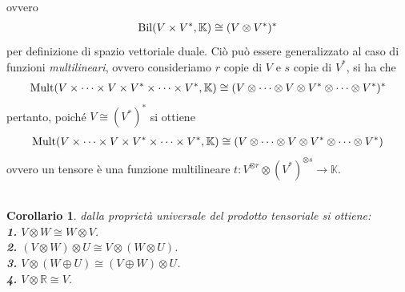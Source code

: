 \documentclass[oneside, 11pt]{amsbook}
\newcommand{\0}{{(0)}}
\newcommand{\3}{{(3)}}
\theoremstyle{colonplain}
\newtheorem{cor}[thm]{Corollario}
\theoremstyle{colondefinition}
\theoremstyle{colonremark}
\numberwithin{equation}{chapter}
\begin{document}
ovvero
\begin{align}
    \mathrm{Bil}(V \times V^*, \mathbb{K}) \cong (V \otimes V^*)^* \notag
\end{align}
per definizione di spazio vettoriale duale. Ciò può essere generalizzato al caso di funzioni \textit{multilineari}, ovvero consideriamo $r$ copie di $V$ e $s$ copie di $V^*$, si ha che
\begin{align}
    \mathrm{Mult}(V \times \dots \times V \times V^* \times \dots \times V^*, \mathbb{K}) \cong (V \otimes \dots \otimes V \otimes V^* \otimes \dots \otimes V^*)^* \notag
\end{align}
pertanto, poiché $V \cong (V^*)^*$ si ottiene
\begin{align}
    \mathrm{Mult}(V \times \dots \times V \times V^* \times \dots \times V^*, \mathbb{K}) \cong (V \otimes \dots \otimes V \otimes V^* \otimes \dots \otimes V^*) \notag
\end{align}
ovvero un tensore è una funzione multilineare $t : V^{\otimes r} \otimes (V^*)^{\otimes s} \longrightarrow \mathbb{K}$. \\ \\
\begin{cor}\label{TensorIso} dalla \textit{proprietà universale del prodotto tensoriale} si ottiene: \\
\textbf{1.} $V \otimes W \cong W \otimes V$. \\
\textbf{2.} $(V \otimes W) \otimes U \cong V \otimes (W \otimes U)$. \\
\textbf{3.} $V \otimes (W \oplus U) \cong (V \oplus W) \otimes U$. \\
\textbf{4.} $V \otimes \mathbb{R} \cong V$.
\end{cor}
\end{document}

